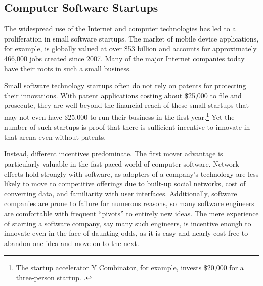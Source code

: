 \documentclass[11pt,twocolumn,titlepage]{article}
\begin{document}
\subsection{Computer Software Startups}
\SectionNote

The widespread use of the Internet and computer
technologies has led to a proliferation in small software startups. The
market of mobile device applications, for example, is globally valued at over
\$53 billion and accounts for approximately 466,000 jobs created
since 2007.
Many of the major Internet companies today have their roots in such a small
business.

Small software technology startups often do not rely on patents for protecting
their innovations. With patent applications costing about \$25,000 to file
and prosecute,
they are well beyond the financial reach of these small startups
that may not even have \$25,000 to run their business in the first
year.\footnote{The startup accelerator Y Combinator, for example, invests
\$20,000 for a three-person startup. .}
Yet the
number of such startups is proof that there is sufficient incentive to innovate
in that arena even without patents.

Instead, different incentives predominate. The first mover advantage is
particularly valuable in the fast-paced world of computer software. Network
effects hold strongly with software, as adopters of a company's
technology are less likely to move to competitive offerings due to built-up
social networks, cost of converting data, and familiarity with user
interfaces.
Additionally, software companies are prone to failure for numerous reasons, so many software engineers are comfortable
with frequent ``pivots'' to entirely new ideas.
The mere experience of starting a
software company, say many such engineers, is incentive enough to innovate even
in the face of daunting odds, as it is easy and nearly cost-free to abandon one
idea and move on to the next.
\end{document}
